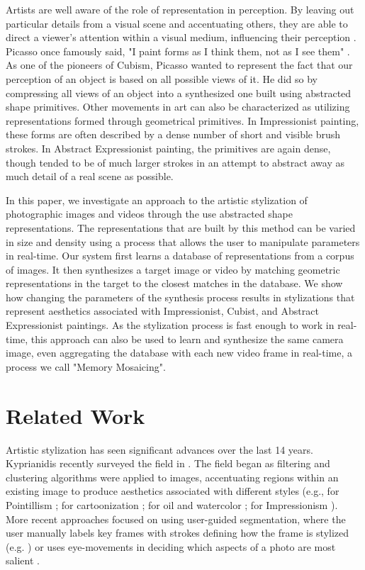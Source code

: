 \documentclass[a4paper,10pt,final]{ThesisStyle}
\begin{document}
Artists are well aware of the role of representation in perception.  By leaving out particular details from a visual scene and accentuating others, they are able to direct a viewer's attention within a visual medium, influencing their perception \cite{Haeberli1990,Zimmer2003}.  Picasso once famously said, "I paint forms as I think them, not as I see them" \cite{Hughes1991}.  As one of the pioneers of Cubism, Picasso wanted to represent the fact that our perception of an object is based on all possible views of it.  He did so by compressing all views of an object into a synthesized one built using abstracted shape primitives.  Other movements in art can also be characterized as utilizing representations formed through geometrical primitives.  In Impressionist painting, these forms are often described by a dense number of short and visible brush strokes.  In Abstract Expressionist painting, the primitives are again dense, though tended to be of much larger strokes in an attempt to abstract away as much detail of a real scene as possible.

In this paper, we investigate an approach to the artistic stylization of photographic images and videos through the use abstracted shape representations.  The representations that are built by this method can be varied in size and density using a process that allows the user to manipulate parameters in real-time.  Our system first learns a database of representations from a corpus of images.  It then synthesizes a target image or video by matching geometric representations in the target to the closest matches in the database.  We show how changing the parameters of the synthesis process results in stylizations that represent aesthetics associated with Impressionist, Cubist, and Abstract Expressionist paintings.  As the stylization process is fast enough to work in real-time, this approach can also be used to learn and synthesize the same camera image, even aggregating the database with each new video frame in real-time, a process we call "Memory Mosaicing".  
\section{Related Work}  
Artistic stylization has seen significant advances over the last 14 years.  Kyprianidis recently surveyed the field in \cite{Kyprianidis2012}.  The field began as filtering and clustering algorithms were applied to images, accentuating regions within an existing image to produce aesthetics associated with different styles (e.g., for Pointillism \cite{Yang2006,Seo2010}; for cartoonization \cite{Wang2004}; for oil and watercolor \cite{Meier1996,Hertzmann2000,Bousseau2007,Gooch2002}; for Impressionism \cite{Litwinowicz1997,Hertzmann1998}).  More recent approaches focused on using user-guided segmentation, where the user manually labels key frames with strokes defining how the frame is stylized (e.g. \cite{O'Donovan2012}) or uses eye-movements in deciding which aspects of a photo are most salient \cite{DeCarlo2002}.
\end{document}
